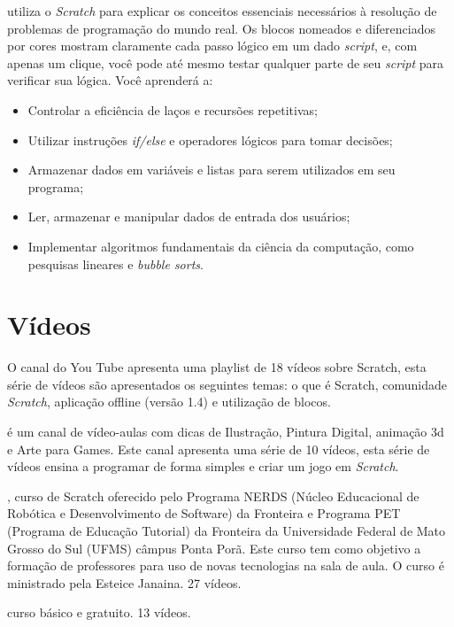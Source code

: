 \documentclass[12pt,fleqn]{book} %
\begin{document}
\textcite{marji2014aprenda} utiliza o \textit{Scratch} para explicar os conceitos essenciais necessários à resolução de problemas de programação do mundo real. Os blocos nomeados e diferenciados por cores mostram claramente cada passo lógico em um dado \textit{script}, e, com apenas um clique, você pode até mesmo testar qualquer parte de seu \textit{script} para verificar sua lógica. Você aprenderá a:

\begin{itemize}
	\item Controlar a eficiência de laços e recursões repetitivas;
	\item Utilizar instruções \textit{if/else} e operadores lógicos para tomar decisões;
	\item Armazenar dados em variáveis e listas para serem utilizados em seu programa;
	
	\item Ler, armazenar e manipular dados de entrada dos usuários;
	\item Implementar algoritmos fundamentais da ciência da computação, como pesquisas lineares e \textit{bubble sorts}.
\end{itemize}

\section{Vídeos}

O canal do You Tube \textcite{apensarem2018} apresenta uma playlist de 18 vídeos sobre Scratch, esta série de vídeos são apresentados os seguintes temas: o que é Scratch, comunidade \textit{Scratch}, aplicação offline (versão 1.4) e utilização de blocos.
	
\textcite{ilustradicas2018} é um canal de vídeo-aulas com dicas de Ilustração, Pintura Digital, animação 3d e Arte para Games. Este canal apresenta uma série de 10 vídeos,  esta série de vídeos ensina a programar de forma simples e criar um jogo em \textit{Scratch}. 
	
\textcite{cursocompleto2018}, curso de Scratch oferecido pelo Programa NERDS (Núcleo Educacional de Robótica e Desenvolvimento de Software) da Fronteira e Programa PET (Programa de Educação Tutorial) da Fronteira da Universidade Federal de Mato Grosso do Sul (UFMS) câmpus Ponta Porã. Este curso tem como objetivo a formação de professores para uso de novas tecnologias na sala de aula. O curso é ministrado pela Esteice Janaina. 27 vídeos.
	
\textcite{cursoexcel2018} curso básico e gratuito. 13 vídeos. 
	
\end{document}
